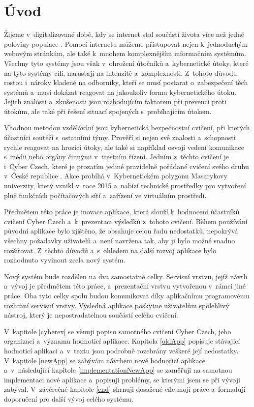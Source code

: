 \documentclass[
  digital,
  twoside,
  table, 
  nolof, 
  nolot
]{fithesis3}
\begin{document}
\chapter{Úvod}

Žijeme v~digitalizované době, kdy se internet stal součástí života více než jedné poloviny populace \cite{worldStats}. Pomocí internetu můžeme přistupovat nejen k~jednoduchým webovým stránkám, ale také k~mnohem komplexnějším informačním systémům. Všechny tyto systémy jsou však v~ohrožení útočníků a~kybernetické útoky, které na tyto systémy cílí, narůstají na intenzitě a~komplexnosti. Z~tohoto důvodu rostou i~nároky kladené na odborníky, kteří se musí postarat o~zabezpečení těch systémů a~musí dokázat reagovat na jakoukoliv formu kybernetického útoku. Jejich znalosti a~zkušenosti jsou rozhodujícím faktorem při prevenci proti útokům, ale také při řešení situací spojených s~probíhajícím útokem.

Vhodnou metodou vzdělávání jsou kybernetická bezpečnostní cvičení, při kterých účastníci soutěží s~ostatními týmy. Prověří si nejen své znalosti a~schopnosti rychle reagovat na hrozící útoky, ale také si například osvojí vedení komunikace s~médii nebo orgány činnými v~trestním řízení. Jedním z~těchto cvičení je i~Cyber Czech, které je prozatím jediné pravidelně pořádané cvičení svého druhu v~České republice \cite{cyberex}. Akce probíhá v~Kybernetickém polygonu Masarykovy univerzity, který vznikl v~roce 2015 a~nabízí technické prostředky pro vytvoření plně funkčních počítačových sítí a~zařízení ve virtuálním prostředí.

Předmětem této práce je inovace aplikace, která slouží k~hodnocení účastníků cvičení Cyber Czech a~k~prezentaci výsledků z~tohoto cvičení. Během používání původní aplikace bylo zjištěno, že obsahuje celou řadu nedostatků, nepokrývá všechny požadavky uživatelů a~není navržena tak, aby ji bylo možné snadno rozšiřovat. Z~těchto důvodů a~s~ohledem na další rozvoj aplikace bylo rozhodnuto vyvinout zcela nový systém. 

Nový systém bude rozdělen na dva samostatné celky. Servisní vrstvu, jejíž návrh a~vývoj je předmětem této práce, a~prezentační vrstvu vytvořenou v~rámci jiné práce. Oba tyto celky spolu budou komunikovat díky aplikačnímu programovému rozhraní servisní vrstvy. Výsledná aplikace poskytne uživatelům spolehlivý nástroj, který je nepostradatelnou součástí celého cvičení. 

V~kapitole \ref{cyberex} se věnuji popisu samotného cvičení Cyber Czech, jeho organizaci a~významu hodnoticí aplikace. Kapitola \ref{oldApp} popisuje stávající hodnoticí aplikaci a~v~textu jsou podrobně rozebrány veškeré její nedostatky. V~kapitole \ref{newApp} se zabývám návrhem nové hodnoticí aplikace a~v~následující kapitole \ref{implementationNewApp} se zaměřuji na samotnou implementaci nové aplikace a~popisuji problémy, se kterými jsem se při vývoji zabýval. V~závěrečné kapitole \ref{end} shrnuji dosažené cíle mojí práce a~formuluji doporučení pro další vývoj celého systému.
\end{document}
